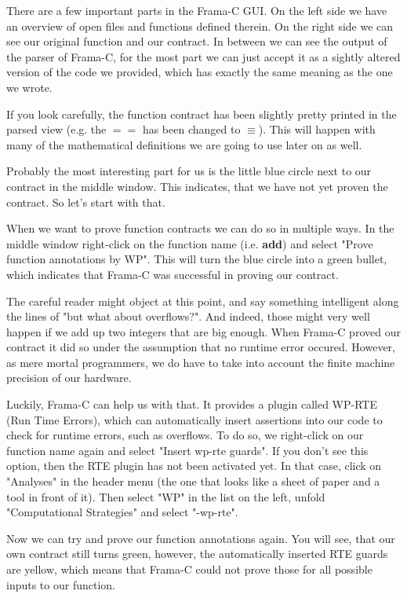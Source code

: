 There are a few important parts in the Frama-C GUI. On the left side we have an overview of open files and functions defined therein. On the right side we can see our original function and our contract. In between we can see the output of the parser of Frama-C, for the most part we can just accept it as a sightly altered version of the code we provided, which has exactly the same meaning as the one we wrote. 

If you look carefully, the function contract has been slightly pretty printed in the parsed view (e.g. the $==$ has been changed to $\equiv$). This will happen with many of the mathematical definitions we are going to use later on as well. 

Probably the most interesting part for us is the little blue circle next to our contract in the middle window. This indicates, that we have not yet proven the contract. So let's start with that. 

When we want to prove function contracts we can do so in multiple ways. In the middle window right-click on the function name (i.e. \textbf{add}) and select "Prove function annotations by WP". This will turn the blue circle into a green bullet, which indicates that Frama-C was successful in proving our contract. 

The careful reader might object at this point, and say something intelligent along the lines of "but what about overflows?". And indeed, those might very well happen if we add up two integers that are big enough. When Frama-C proved our contract it did so under the assumption that no runtime error occured. However, as mere mortal programmers, we do have to take into account the finite machine precision of our hardware. 

Luckily, Frama-C can help us with that. It provides a plugin called WP-RTE (Run Time Errors), which can automatically insert assertions into our code to check for runtime errors, such as overflows. To do so, we right-click on our function name again and select "Insert wp-rte guards". If you don't see this option, then the RTE plugin has not been activated yet. In that case, click on "Analyses" in the header menu (the one that looks like a sheet of paper and a tool in front of it). Then select "WP" in the list on the left, unfold "Computational Strategies" and select "-wp-rte". 

Now we can try and prove our function annotations again. You will see, that our own contract still turns green, however, the automatically inserted RTE guards are yellow, which means that Frama-C could not prove those for all possible inputs to our function. 

